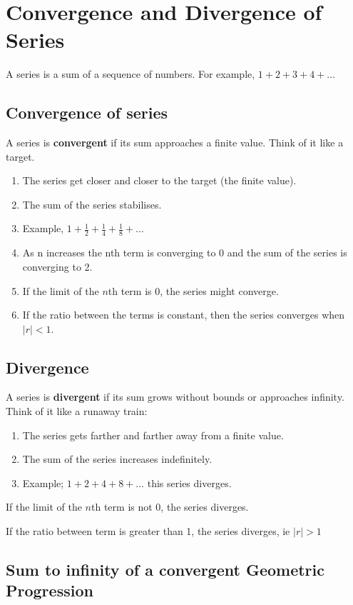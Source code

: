 \section{Convergence and Divergence of Series}

A series is a sum of a sequence of numbers. For example, $1 + 2 + 3 + 4 + \ldots$

\subsection{Convergence of series}

A series is \textbf{convergent} if its sum approaches a finite value. Think of it like a target.
\begin{enumerate}
  \item The series get closer and closer to the target (the finite value).
  \item The sum of the series stabilises.
  \item Example, $1 + \frac{1}{2} + \frac{1}{4} + \frac{1}{8} + \ldots$
  \item As n increases the nth term is converging to 0 and the sum of the series is
  converging to 2.
  \item If the limit of the $n$th term is 0, the series might converge.
  \item If the ratio between the terms is constant, then the series converges when
  $|r| < 1$.
\end{enumerate}

\subsection{Divergence}

A series is \textbf{divergent} if its sum grows without bounds or approaches infinity.
Think of it like a runaway train:
\begin{enumerate}
  \item The series gets farther and farther away from a finite value.
  \item The sum of the series increases indefinitely.
  \item Example; $1 + 2 + 4 + 8 + \ldots$ this series diverges.
\end{enumerate}
If the limit of the $n$th term is not 0, the series diverges.

If the ratio between term is greater than 1, the series diverges, ie $|r| > 1$

\subsection{Sum to infinity of a convergent Geometric Progression}


